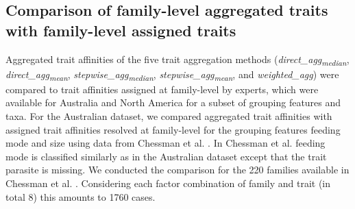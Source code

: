 \documentclass{article}
\begin{document}




\subsection*{Comparison of family-level aggregated traits with family-level assigned traits}



Aggregated trait affinities of the five trait aggregation methods (\textit{direct\_agg\textsubscript{median}}, \textit{direct\_agg\textsubscript{mean}}, \textit{stepwise\_agg\textsubscript{median}}, \textit{stepwise\_agg\textsubscript{mean}}, and \textit{weighted\_agg}) were compared to trait affinities assigned at family-level by experts, which were available for Australia and North America for a subset of grouping features and taxa. For the Australian dataset, we compared aggregated trait affinities with assigned trait affinities resolved at family-level for the grouping features feeding mode and size using data from Chessman et al. \cite{chessman_dissolved-oxygen_2018}. In Chessman et al. \cite{chessman_dissolved-oxygen_2018} feeding mode is classified similarly as in the Australian dataset except that the trait parasite is missing. We conducted the comparison for the 220 families available in Chessman et al. \cite{chessman_dissolved-oxygen_2018}. Considering each factor combination of family and trait (in total 8) this amounts to 1760 cases.
\end{document}
